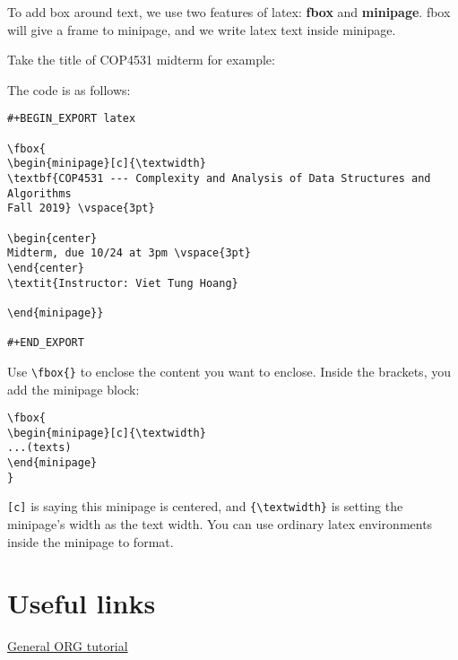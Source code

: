 \documentclass[11pt]{article}
\begin{document}
To add box around text, we use two features of latex: \textbf{fbox} and \textbf{minipage}. fbox will give a frame to minipage, and we write latex text inside minipage.

Take the title of COP4531 midterm for example:


The code is as follows:
\begin{Verbatim}[frame=single]
#+BEGIN_EXPORT latex

\fbox{
\begin{minipage}[c]{\textwidth}
\textbf{COP4531 --- Complexity and Analysis of Data Structures and Algorithms
Fall 2019} \vspace{3pt}

\begin{center}
Midterm, due 10/24 at 3pm \vspace{3pt}
\end{center}
\textit{Instructor: Viet Tung Hoang}

\end{minipage}}

#+END_EXPORT
\end{Verbatim}


Use \texttt{\textbackslash{}fbox\{\}} to enclose the content you want to enclose. Inside the brackets, you add the minipage block:
\begin{Verbatim}[frame=single]
\fbox{
\begin{minipage}[c]{\textwidth}
...(texts)
\end{minipage}
}
\end{Verbatim}
\texttt{[c]} is saying this minipage is centered, and \texttt{\{\textbackslash{}textwidth\}} is setting the minipage's width as the text width. You can use ordinary latex environments inside the minipage to format.



\section{Useful links}
\label{sec:org9dc40e7}
\href{http://doc.norang.ca/org-mode.html}{General ORG tutorial}
\end{document}
